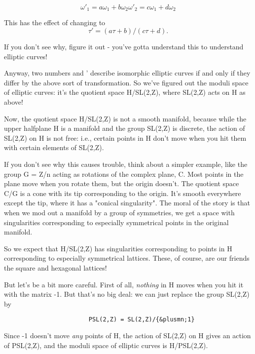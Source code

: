 $$
                 \omega '_{1} = a \omega _{1} + b \omega _{2}

                 \omega '_{2} = c \omega _{1} + d \omega _{2}
$$
    
This has the effect of changing \tau  to 
$$
                \tau ' = (a \tau  + b)/(c \tau  + d).
$$
    
If you don't see why, figure it out - you've gotta understand this to
understand elliptic curves!    

Anyway, two numbers \tau  and \tau ' describe isomorphic elliptic curves
if and only if they differ by the above sort of transformation.  So
we've figured out the moduli space of elliptic curves: it's the
quotient space H/SL(2,Z), where SL(2,Z) acts on H as above!

Now, the quotient space H/SL(2,Z) is not a smooth manifold, because
while the upper halfplane H is a manifold and the group SL(2,Z) is
discrete, the action of SL(2,Z) on H is not free: i.e., certain points
in H don't move when you hit them with certain elements of SL(2,Z).

If you don't see why this causes trouble, think about a simpler
example, like the group G = Z/n acting as rotations of the complex
plane, C.  Most points in the plane move when you rotate them, but the
origin doesn't.  The quotient space C/G is a cone with its tip
corresponding to the origin.  It's smooth everywhere except the tip,
where it has a "conical singularity".  The moral of the story is that
when we mod out a manifold by a group of symmetries, we get a space
with singularities corresponding to especially symmetrical points in
the original manifold.

So we expect that H/SL(2,Z) has singularities corresponding to points in
H corresponding to especially symmetrical lattices.   These, of course,
are our friends the square and hexagonal lattices!

But let's be a bit more careful.  First of all, \emph{nothing} 
in H moves when 
you hit it with the matrix -1.  But that's no big deal: we can just
replace the group SL(2,Z) by 

\begin{verbatim}
                        PSL(2,Z) = SL(2,Z)/{&plusmn;1}
\end{verbatim}
    
Since -1 doesn't move \emph{any} points of H, the action of SL(2,Z) on H
gives an action of PSL(2,Z), and the moduli space of elliptic curves is
H/PSL(2,Z).  

